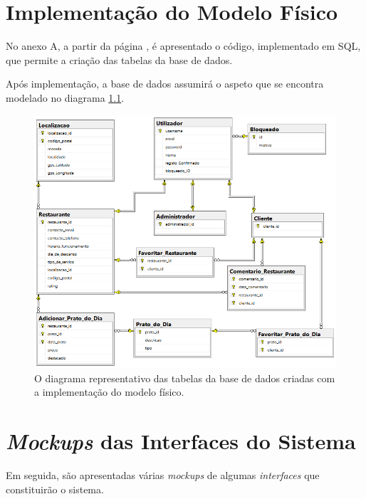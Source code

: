 \documentclass[a4paper,12pt]{report}
\begin{document}
\chapter{Implementação do Modelo Físico}

	No anexo A, a partir da página \pageref{anexoA}, é apresentado o código, implementado em SQL, que permite a criação das tabelas da base de dados. 
	
	Após implementação, a base de dados assumirá o aspeto que se encontra modelado no diagrama \ref{fig:diagramaModeloFisicoSQL}.


\begin{figure}[H]
	\begin{center}
	\includegraphics[scale=0.65]{diagramaModeloFisicoSQL}	
	\end{center}
	\medskip
	\caption{O diagrama representativo das tabelas da base de dados criadas com a implementação do modelo físico.}
	\label{fig:diagramaModeloFisicoSQL}	
	\end{figure}




\chapter{\textit{Mockups} das Interfaces do Sistema}	

	Em seguida, são apresentadas várias \textit{mockups} de algumas \textit{interfaces} que constituirão o sistema.
	
\end{document}
